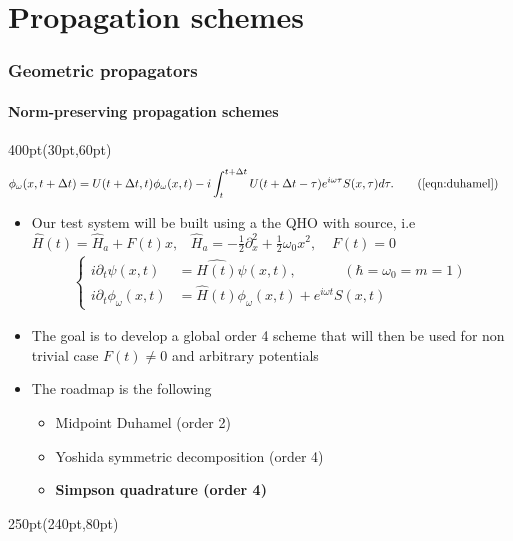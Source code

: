 \section{Propagation schemes}
\begin{frame}
\frametitle{Geometric propagators}
	\framesubtitle{Norm-preserving propagation schemes}
\footnotesize
\begin{textblock*}{400pt}(30pt,60pt)
\begin{align}
       \phi_\omega(x,t+\Delta t) & = U(t+\Delta t,t)\phi_\omega(x,t)
	  -i\int_{t}^{t+\Delta t} U(t+\Delta t-\tau)e^{i\omega \tau} 
	  S(x,\tau)d\tau. \tag{\ref{eqn:duhamel}}
\end{align}
         \begin{itemize}
	\footnotesize
\item Our test system will be built using a the QHO
	with source, i.e \\
	       $\hat{H}(t) = \hat{H}_a + F(t)x, \;\;\; 
	        \hat{H}_a = -\frac{1}{2}\partial^2_x + \frac{1}{2}\omega_0 x^2, \;\;\;\ 
			 F(t) = 0$
\begin{align}
\begin{cases}
	i{\partial_t}\psi(x,t)
	   & = \hat{H(t)}
	   \psi(x,t),   \hspace{40pt}   (\hbar = \omega_0 = m = 1)    \\
	i{\partial_t}\phi_\omega(x,t)
	   & = \hat{H}(t) 
	   \phi_\omega (x,t)
	   + e^{i\omega t} S(x,t) \label{eqn:coupled_forced_qho} 
\end{cases}
\end{align}
    \item The goal is to develop a global order 4 scheme that will then be used 
	 for non trivial case $F(t)\neq 0$ and arbitrary potentials
    \item The roadmap is the following 
                  \begin{itemize}
	          \footnotesize
	           \item[$\bullet$] Midpoint Duhamel (order 2) \checkmark
		   \item[$\bullet$] Yoshida symmetric 
			   decomposition (order 4) \checkmark
		   \item[$\bullet$] \textbf{Simpson quadrature (order 4)}
                   \end{itemize}
\end{itemize}
\end{textblock*}


\begin{textblock*}{250pt}(240pt,80pt)
\end{textblock*}

\end{frame}



